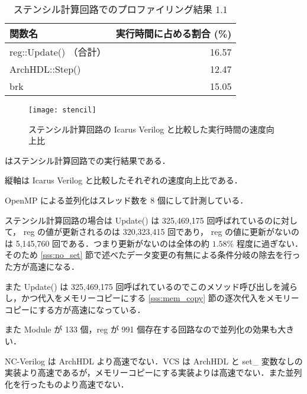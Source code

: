 \begin{table}[t]
 \caption{ステンシル計算回路でのプロファイリング結果 1.1}
 \label{table:stencil_prof1.1}
 \begin{center}
  \begin{tabular}{lr} \toprule
  関数名 & 実行時間に占める割合 (\%) \\ \midrule
  reg::Update() （合計） & 16.57 \\
  ArchHDL::Step() & 12.47 \\
  brk & 15.05 \\ \bottomrule
  \end{tabular}
 \end{center}
\end{table}

\fi

\begin{figure}[t]
 \centering
 \texttt{[image: stencil]}
 \caption{ステンシル計算回路の Icarus Verilog と比較した実行時間の速度向上比}
 \label{fig:stencil}
\end{figure}

 はステンシル計算回路での実行結果である．

縦軸は Icarus Verilog と比較したそれぞれの速度向上比である．

OpenMP による並列化はスレッド数を 8 個にして計測している．

ステンシル計算回路の場合は Update() は 325,469,175
回呼ばれているのに対して， reg の値が更新されるのは 320,323,415
回であり， reg の値に更新がないのは 5,145,760
回である．つまり更新がないのは全体の約 $1.58\%$ 程度に過ぎない．そのため
\ref{sss:no_set}
節で述べたデータ変更の有無による条件分岐の除去を行った方が高速になる．

また Update() は 325,469,175
回呼ばれているのでこのメソッド呼び出しを減らし，かつ代入をメモリーコピーにする
\ref{sss:mem_copy}
節の逐次代入をメモリーコピーにする方が高速になっている．

また Module が 133 個，reg が 991
個存在する回路なので並列化の効果も大きい．

NC-Verilog は ArchHDL より高速でない．VCS は ArchHDL と set\_
変数なしの実装より高速であるが，メモリーコピーにする実装よりは高速でない．また並列化を行ったものより高速でない．




